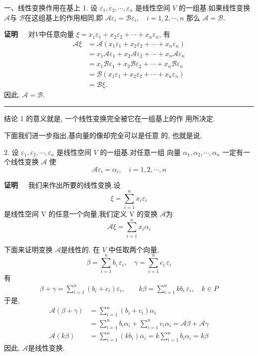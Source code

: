 \documentclass[13pt]{beamer}
\def\qed{\nopagebreak\hfill{\rule{4pt}{7pt}}\medbreak}
\def\pf{{\bf 证明~~ }}
\def\A{\mathscr{A}}
\def\B{\mathscr{B}}
\def\a{\alpha}
\begin{document}
\begin{frame}{一、线性变换作用在基上}
1. 设 ${\varepsilon}_{1}, {\varepsilon}_{2}, \cdots, {\varepsilon}_{n}$ 是线性空间 $V$ 的一组基.如果线性变换
$\A$与 $\B$在这组基上的作用相同,即
$\mathscr{A} {\varepsilon}_{i}=\mathscr{B} {\varepsilon}_{i}, \quad i=1,2, \cdots, n$
那么 $\mathscr{A}=\mathscr{B}$.

\pf 对$V$中任意向量
$\xi = x_{1} {\varepsilon}_{1}+x_{2} {\varepsilon}_{2}+\cdots+x_{n} {\varepsilon}_{n}$, 有
\begin{align*} 
\mathscr{A} {\xi} 
&=\mathscr{A}\left(x_{1} {\varepsilon}_{1}+x_{2} {\varepsilon}_{2}+\cdots+x_{n} {\varepsilon}_{n}\right) \\ 
&=x_{1} \mathscr{A}{\varepsilon}_{1}+x_{2} \mathscr{A}{\varepsilon}_{2}+\cdots+x_{n} \mathscr{A}{\varepsilon}_{n} \\
&=x_{1} \mathscr{B} {\varepsilon}_{1}+x_{2} \mathscr{B}{\varepsilon}_{2}+\cdots+x_{n} \mathscr{B}{\varepsilon}_{n} \\
&=\mathscr{B}\left(x_{1} {\varepsilon}_{1}+x_{2} {\varepsilon}_{2}+\cdots+x_{n} {\varepsilon}_{n}\right) \\ 
&= \mathscr{B} {\xi}.
\end{align*}
因此, $\mathscr{A}=\mathscr{B}$. \qed

结论 1 的意义就是, 一个线性变换完全被它在一组基上的作 用所决定.
\end{frame}

\begin{frame}
下面我们进一步指出,基向量的像却完全可以是任意 的, 也就是说, 

2. 设 ${\varepsilon}_{1}, {\varepsilon}_{2}, \cdots, {\varepsilon}_{n}$ 是线性空间 $V$ 的一组基.对任意一组
向量 ${\alpha}_{1}, {\alpha}_{2}, \cdots, {\alpha}_{n}$ 一定有一个线性变换 $\A$ 使
\[
\A \varepsilon_{i}={\a}_{i}, \quad i=1, 2, \cdots, n
\]

\pf 
我们来作出所要的线性变换.设
\[
\xi=\sum_{i=1}^{n} x_{i} \varepsilon_{i}
\]
是线性空间 V 的任意一个向量,我们定义 V 的变换 $\A$为
\[
\mathscr{A} \xi=\sum_{i=1}^{n} x_{i} {\alpha}_{i}
\]
\end{frame}

\begin{frame}
下面来证明变换 $\A$是线性的. 
在 $V$ 中任取两个向量, 
\[
{\beta}=\sum_{i=1}^{n} b_{i} \, {\varepsilon}_{i}, \quad \gamma=\sum_{i=1}^{n} c_{i}\, {\varepsilon}_{i}
\]
有
\begin{align*}
{\beta}+\gamma =\sum_{i=1}^{n}\left(b_{i}+c_{i}\right) {\varepsilon}_{i}, \qquad 
k {\beta}  =\sum_{i=1}^{n} k b_{i} \, {\varepsilon}_{i},  \quad k \in P
\end{align*}
于是, 
\begin{align*}
\mathscr{A}({\beta}+{\gamma})& =\sum_{i=1}^{n}\left(b_{i}+c_{i}\right) {\alpha}_{i}\\
&=\sum_{i=1}^{n} b_{i} {\alpha}_{i}+\sum_{i=1}^{n} c_{i} {\alpha}_{i}=\mathscr{A} {\beta}+\A {\gamma} \\
\mathscr{A}({k} {\beta}) &=\sum_{i=1}^{n} (k b_{i}) {\alpha}_{i}=k \sum_{i=1}^{n} b_{i} {\alpha}_{i}=k   {\beta}
\end{align*}
因此, $\mathscr{A}$是线性变换. 
\end{frame}
\end{document}

